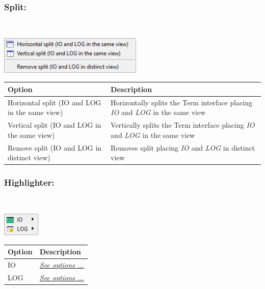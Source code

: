 \hypertarget{menu_view_r_term_split}{}
\subsubsection{Split:}\\

\includegraphics[scale=0.8]{./res/menu_r_term_split.png}\\

\begin{scriptsize}
  \begin{tabularx}{\textwidth}{>{\hsize=1\hsize}X>{\hsize=0.7\hsize}X}\\
    \hline
    \textbf{Option} & \textbf{Description} \\
    \hline
    Horizontal split (IO and LOG in the same view) & Horizontally splits the Term interface placing
     \textit{IO} and \textit{LOG} in the same view \\
    Vertical split (IO and LOG in the same view) & Vertically splits the Term interface placing
     \textit{IO} and \textit{LOG} in the same view \\
    \hdashline[1pt/1pt]
    Remove split (IO and LOG in distinct view) & Removes split placing
     \textit{IO} and \textit{LOG} in distinct view \\
    \hline
  \end{tabularx}
\end{scriptsize}


\newpage
\hypertarget{menu_view_r_term_highlighter}{}
\subsubsection{Highlighter:}\\

\includegraphics[scale=0.8]{./res/menu_r_term_highlighter.png}\\

\begin{scriptsize}
  \begin{tabularx}{\textwidth}{>{\hsize=0.3\hsize}X>{\hsize=0.7\hsize}X}\\
    \hline
    \textbf{Option} & \textbf{Description} \\
    \hline
    IO & \textit{\href{\#menu\_r\_term\_highlighter\_IO}{See options ...}} \\
    LOG & \textit{\href{\#menu\_r\_term\_highlighter\_Log}{See options ...}} \\
    \hline
  \end{tabularx}
\end{scriptsize}


